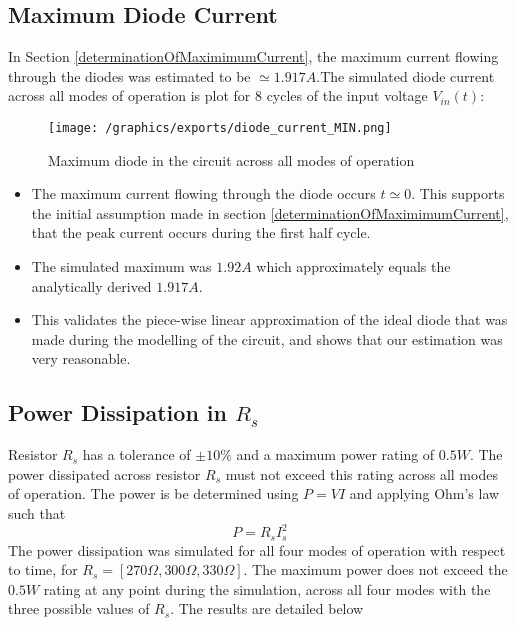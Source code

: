 \pagebreak
\subsection{Maximum Diode Current}
In Section \ref{determinationOfMaximimumCurrent}, the maximum current flowing through the diodes was estimated to be $\simeq 1.917A$.The simulated diode current across all modes of operation is plot for 8 cycles of the input voltage $V_{in}(t)$:
\begin{figure}[H]
	\centering
	\texttt{[image: /graphics/exports/diode\_current\_MIN.png]}
	\caption{Maximum diode in the circuit across all modes of operation}
\end{figure}

\begin{itemize}
	\item The maximum current flowing through the diode occurs $t \simeq 0$. This supports the initial assumption made in section \ref{determinationOfMaximimumCurrent}, that the peak current occurs during the first half cycle.
	\item The simulated maximum was $1.92A$ which approximately equals the analytically derived $1.917A$. 
	\item This validates the piece-wise linear approximation of the ideal diode that was made during the modelling of the circuit, and shows that our estimation was very reasonable. 
\end{itemize}

\pagebreak
\subsection{Power Dissipation in $R_s$}
Resistor $R_s$ has a tolerance of $\pm 10\%$ and a maximum power rating of $0.5W$. The power dissipated across resistor $R_s$ must not exceed this rating across all modes of operation. The power is be determined using $P=VI$ and applying Ohm's law such that
\begin{equation}
	P=R_sI_s^2
\end{equation}
The power dissipation was simulated for all four modes of operation with respect to time, for $R_s = [270\Omega, 300\Omega, 330\Omega]$. The maximum power does not exceed the $0.5W$ rating at any point during the simulation, across all four modes with the three possible values of $R_s$.  The results are detailed below

